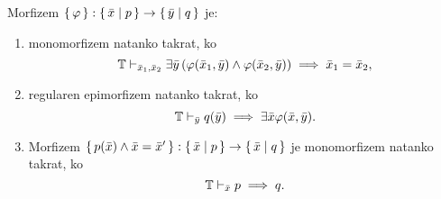 \documentclass[../kategoricna_logika.tex]{subfiles}
\begin{document}
\begin{lema}\label{lema:morfizmi-v-sintakticni-kategoriji}
  Morfizem
  $\lbrace\,\varphi\,\rbrace : \lbrace\,\bar{x} \mid  p\,\rbrace \to
  \lbrace\,\bar{y} \mid  q\,\rbrace$ je:
  \begin{enumerate}[label=(\roman*)]
  \item monomorfizem natanko takrat, ko
      $$\mathbb{T} \vdash_{\bar{x}_1,\bar{x}_2}  \exists \bar{y} \left( \varphi(\bar{x}_1,\bar{y}) \wedge \varphi(\bar{x}_2,\bar{y}) \right) \implies \bar{x}_1 = \bar{x}_2 ,$$
    \item regularen epimorfizem natanko takrat, ko
      $$\mathbb{T} \vdash_{\bar{y}} q(\bar{y}) \implies \exists \bar{x} \varphi(\bar{x},\bar{y}).$$
    \item Morfizem
      $\lbrace\,p(\bar{x}) \wedge \bar{x} = \bar{x}'\,\rbrace :
      \lbrace\,\bar{x} \mid  p \,\rbrace \to \lbrace\,\bar{x} \mid  q\,\rbrace$ je
      monomorfizem natanko takrat, ko
      $$\mathbb{T} \vdash_{\bar{x}} p \implies q.$$
    \end{enumerate}
  \end{lema}
\end{document}
